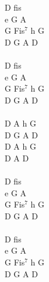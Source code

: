 \documentclass[a5paper, 10pt]{book}
\begin{document}
\begin{minipage}[t]{0.25\textwidth}
D fis\\
e G A\\
G Fis$^7$ h G\\
D G A D\\
\\
D fis\\
e G A\\
G Fis$^7$ h G\\
D G A D\\
\\
D A h G\\
D G A D\\
D A h G\\
D A D\\
\\
D fis\\
e G A\\
G Fis$^7$ h G\\
D G A D\\
\\
D fis\\
e G A\\
G Fis$^7$ h G\\
D G A D\\
\end{minipage}

\newpage
\end{document}
